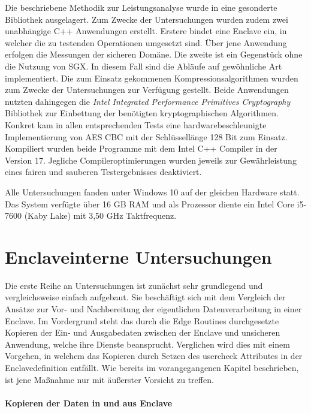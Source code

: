 Die beschriebene Methodik zur Leistungsanalyse wurde in eine gesonderte Bibliothek ausgelagert. Zum Zwecke der Untersuchungen wurden zudem zwei unabhängige C++ Anwendungen erstellt. Erstere bindet eine Enclave ein, in welcher die zu testenden Operationen umgesetzt sind. Über jene Anwendung erfolgen die Messungen der sicheren Domäne. Die zweite ist ein Gegenstück ohne die Nutzung von SGX. In diesem Fall sind die Abläufe auf gewöhnliche Art implementiert. Die zum Einsatz gekommenen Kompressionsalgorithmen wurden zum Zwecke der Untersuchungen zur Verfügung gestellt. Beide Anwendungen nutzten dahingegen die \textit{Intel Integrated Performance Primitives Cryptography} Bibliothek zur Einbettung der benötigten kryptographischen Algorithmen. Konkret kam in allen entsprechenden Tests eine hardwarebeschleunigte Implementierung von AES CBC mit der Schlüssellänge 128 Bit zum Einsatz. Kompiliert wurden beide Programme mit dem Intel C++ Compiler in der Version 17. Jegliche Compileroptimierungen wurden jeweils zur Gewährleistung eines fairen und sauberen Testergebnisses deaktiviert. 

Alle Untersuchungen fanden unter Windows 10 auf der gleichen Hardware statt. Das System verfügte über 16 GB RAM und als Prozessor diente ein Intel Core i5-7600 (Kaby Lake) mit 3,50 GHz Taktfrequenz.

\section{Enclaveinterne Untersuchungen}

Die erste Reihe an Untersuchungen ist zunächst sehr grundlegend und vergleichsweise einfach aufgebaut. Sie beschäftigt sich mit dem Vergleich der Ansätze zur Vor- und Nachbereitung der eigentlichen Datenverarbeitung in einer Enclave. Im Vordergrund steht das durch die Edge Routines durchgesetzte Kopieren der Ein- und Ausgabedaten zwischen der Enclave und unsicheren Anwendung, welche ihre Dienste beansprucht. Verglichen wird dies mit einem Vorgehen, in welchem das Kopieren durch Setzen des user\textunderscore check Attributes in der Enclavedefinition entfällt. Wie bereits im vorangegangenen Kapitel beschrieben, ist jene Maßnahme nur mit äußerster Vorsicht zu treffen.

\paragraph{Kopieren der Daten in und aus Enclave}

